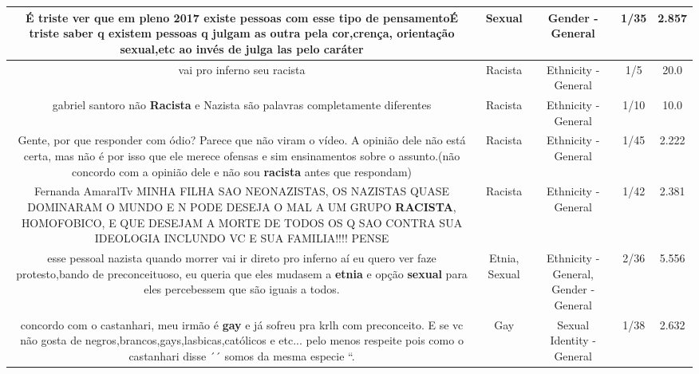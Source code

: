 \documentclass[11pt]{article}
\newlength\mylength
\begin{document}
\begin{center}
\begin{longtable}{|C{.65\mylength}|C{.30\mylength}|C{.12\mylength}|C{.12\mylength}|C{.12\mylength}|}
  \small É triste ver que em pleno 2017 existe pessoas com esse tipo de pensamentoÉ triste saber q existem pessoas q julgam as outra pela cor,crença, orientação \textbf{sexual},etc   ao invés de julga las pelo caráter\normalsize   & Sexual & Gender - General & 1/35 & 2.857 \\  \hline
  \small vai pro inferno seu racista\normalsize   & Racista & Ethnicity - General & 1/5 & 20.0 \\  \hline
  \small gabriel santoro não \textbf{Racista} e Nazista são palavras completamente diferentes\normalsize   & Racista & Ethnicity - General & 1/10 & 10.0 \\  \hline
  \small Gente, por que responder com ódio? Parece que não viram o vídeo. A opinião dele não está certa, mas não é por isso que ele merece ofensas e sim ensinamentos sobre o assunto.(não concordo com a opinião dele e não sou \textbf{racista} antes que respondam)\normalsize   & Racista & Ethnicity - General & 1/45 & 2.222 \\  \hline
  \small Fernanda AmaralTv MINHA FILHA SAO NEONAZISTAS, OS NAZISTAS QUASE DOMINARAM O MUNDO E N PODE DESEJA O MAL A UM GRUPO \textbf{RACISTA}, HOMOFOBICO, E QUE DESEJAM A MORTE DE TODOS OS Q SAO CONTRA SUA IDEOLOGIA INCLUNDO VC E SUA FAMILIA!!!! PENSE\normalsize   & Racista & Ethnicity - General & 1/42 & 2.381 \\  \hline
  \small esse pessoal nazista quando morrer vai ir direto pro inferno aí eu quero ver faze protesto,bando de preconceituoso, eu queria que eles mudasem a \textbf{etnia} e opção \textbf{sexual} para eles percebessem que são iguais a todos.\normalsize   & Etnia, Sexual & Ethnicity - General, Gender - General & 2/36 & 5.556 \\  \hline
  \small concordo com o castanhari, meu irmão é \textbf{gay} e já sofreu pra krlh com preconceito. E se vc não gosta de negros,brancos,gays,lasbicas,católicos e etc... pelo menos respeite pois como o castanhari disse ´´ somos da mesma especie ``.\normalsize   & Gay & Sexual Identity - General & 1/38 & 2.632 \\  \hline

\end{longtable}
\end{center}
\end{document}
